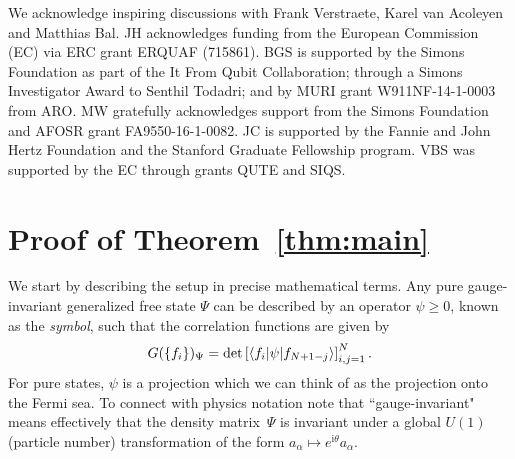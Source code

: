 \documentclass[aps,pra,reprint,superscriptaddress,floatfix,amsmath,amssymb,amsfonts]{revtex4-1}
\begin{document}
\begin{acknowledgments}
We acknowledge inspiring discussions with Frank Verstraete, Karel van Acoleyen and Matthias Bal.
JH acknowledges funding from the European Commission (EC) via ERC grant ERQUAF (715861).
BGS is supported by the Simons Foundation as part of the It From Qubit Collaboration; through a Simons Investigator Award to Senthil Todadri; and by MURI grant W911NF-14-1-0003 from ARO.
MW gratefully acknowledges support from the Simons Foundation and AFOSR grant FA9550-16-1-0082.
JC is supported by the Fannie and John Hertz Foundation and the Stanford Graduate Fellowship program.
VBS was supported by the EC through grants QUTE and SIQS.
\end{acknowledgments}



\cleardoublepage\onecolumngrid\appendix

\section{Proof of Theorem~\ref{thm:main}}\label{app:proof}

We start by describing the setup in precise mathematical terms.
Any pure gauge-invariant generalized free state $\Psi$ can be described by an operator $\psi\geq0$, known as the \emph{symbol}, such that the correlation functions are given by
\begin{equation}\label{eq:G from symbol}
  G(\{f_i\})_\Psi = \det\left[\braket{f_i | \psi | f_{N+1-j}}\right]_{i,j=1}^N.
\end{equation}
For pure states, $\psi$ is a projection which we can think of as the projection onto the Fermi sea.
To connect with physics notation note that ``gauge-invariant" means effectively that the density matrix~$\Psi$ is invariant under a global $U(1)$ (particle number) transformation of the form $a_\alpha \mapsto e^{\mathrm{i} \theta} a_\alpha$.
\end{document}
